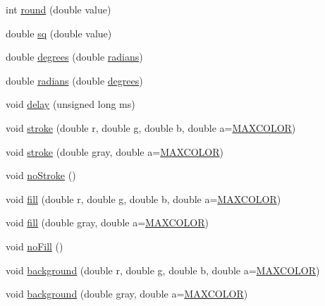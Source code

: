 \begin{DoxyCompactItemize}
\item 
int \hyperlink{namespacecprocessing_a37d82dab509470561df4e8ac40bdce71}{round} (double value)
\item 
double \hyperlink{namespacecprocessing_a5b9c7c8fe6eeabc902cac120592809c6}{sq} (double value)
\item 
double \hyperlink{namespacecprocessing_ab1ad6d58130b9a22ae19489920513d1f}{degrees} (double \hyperlink{namespacecprocessing_a8e4f15390e12437ed626441da1cc767d}{radians})
\item 
double \hyperlink{namespacecprocessing_a8e4f15390e12437ed626441da1cc767d}{radians} (double \hyperlink{namespacecprocessing_ab1ad6d58130b9a22ae19489920513d1f}{degrees})
\item 
void \hyperlink{namespacecprocessing_a764fa48b70712470f922b98463b77bf4}{delay} (unsigned long ms)
\item 
void \hyperlink{namespacecprocessing_a7c1883da06a9fc2827b361d815e187ca}{stroke} (double r, double g, double b, double a=\hyperlink{color_8hpp_acd61a23b73083918e86cc349ed38c076}{\-M\-A\-X\-C\-O\-L\-O\-R})
\item 
void \hyperlink{namespacecprocessing_ad11d761eb5722c023b181750127da794}{stroke} (double gray, double a=\hyperlink{color_8hpp_acd61a23b73083918e86cc349ed38c076}{\-M\-A\-X\-C\-O\-L\-O\-R})
\item 
void \hyperlink{namespacecprocessing_a19914d41fcc0d755c4d754800b2f5147}{no\-Stroke} ()
\item 
void \hyperlink{namespacecprocessing_a1d7a78063b1f888c9d8a02e3fb751691}{fill} (double r, double g, double b, double a=\hyperlink{color_8hpp_acd61a23b73083918e86cc349ed38c076}{\-M\-A\-X\-C\-O\-L\-O\-R})
\item 
void \hyperlink{namespacecprocessing_aabb2ff8c883f75ff0993842e65802e10}{fill} (double gray, double a=\hyperlink{color_8hpp_acd61a23b73083918e86cc349ed38c076}{\-M\-A\-X\-C\-O\-L\-O\-R})
\item 
void \hyperlink{namespacecprocessing_ae8ea8721096bb466fdbb304304ff9e1e}{no\-Fill} ()
\item 
void \hyperlink{namespacecprocessing_ae28ec65927b7f3edc953cacd9a67543a}{background} (double r, double g, double b, double a=\hyperlink{color_8hpp_acd61a23b73083918e86cc349ed38c076}{\-M\-A\-X\-C\-O\-L\-O\-R})
\item 
void \hyperlink{namespacecprocessing_a73406cb49ec7dad230a67ca56c19597a}{background} (double gray, double a=\hyperlink{color_8hpp_acd61a23b73083918e86cc349ed38c076}{\-M\-A\-X\-C\-O\-L\-O\-R})
\item 

\end{DoxyCompactItemize}
